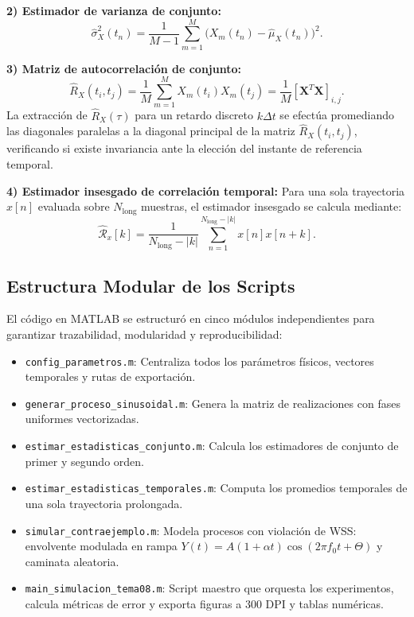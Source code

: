 \documentclass[conference]{IEEEtran}
\begin{document}
\textbf{2) Estimador de varianza de conjunto:}
\begin{equation}
\hat{\sigma}_X^2(t_n) = \frac{1}{M - 1} \sum_{m=1}^{M} \big( X_m(t_n) - \hat{\mu}_X(t_n) \big)^2.
\end{equation}

\textbf{3) Matriz de autocorrelación de conjunto:}
\begin{equation}
\hat{R}_X(t_i, t_j) = \frac{1}{M} \sum_{m=1}^{M} X_m(t_i) X_m(t_j) = \frac{1}{M} [\mathbf{X}^T \mathbf{X}]_{i,j}.
\end{equation}
La extracción de $\hat{R}_X(\tau)$ para un retardo discreto $k \Delta t$ se efectúa promediando las diagonales paralelas a la diagonal principal de la matriz $\hat{R}_X(t_i, t_j)$, verificando si existe invariancia ante la elección del instante de referencia temporal.

\textbf{4) Estimador insesgado de correlación temporal:}
Para una sola trayectoria $x[n]$ evaluada sobre $N_{\text{long}}$ muestras, el estimador insesgado se calcula mediante:
\begin{equation}
\hat{\mathcal{R}}_x[k] = \frac{1}{N_{\text{long}} - |k|} \sum_{n=1}^{N_{\text{long}} - |k|} x[n] x[n + k].
\end{equation}

\subsection{Estructura Modular de los Scripts}
El código en MATLAB se estructuró en cinco módulos independientes para garantizar trazabilidad, modularidad y reproducibilidad:
\begin{itemize}
    \item \texttt{config\_parametros.m}: Centraliza todos los parámetros físicos, vectores temporales y rutas de exportación.
    \item \texttt{generar\_proceso\_sinusoidal.m}: Genera la matriz de realizaciones con fases uniformes vectorizadas.
    \item \texttt{estimar\_estadisticas\_conjunto.m}: Calcula los estimadores de conjunto de primer y segundo orden.
    \item \texttt{estimar\_estadisticas\_temporales.m}: Computa los promedios temporales de una sola trayectoria prolongada.
    \item \texttt{simular\_contraejemplo.m}: Modela procesos con violación de WSS: envolvente modulada en rampa $Y(t) = A(1 + \alpha t)\cos(2\pi f_0 t + \Theta)$ y caminata aleatoria.
    \item \texttt{main\_simulacion\_tema08.m}: Script maestro que orquesta los experimentos, calcula métricas de error y exporta figuras a 300 DPI y tablas numéricas.
\end{itemize}
\end{document}
